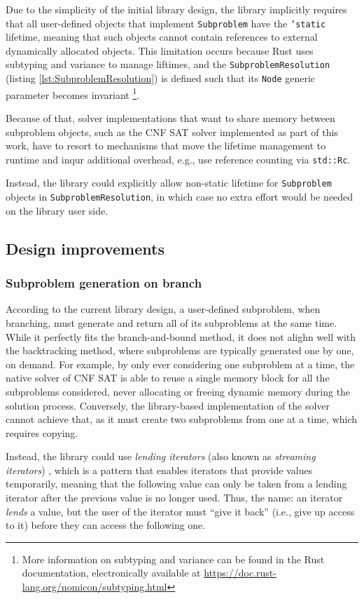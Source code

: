 Due to the simplicity of the initial library design, the library implicitly requires
that all user-defined objects that implement \texttt{Subproblem} have the \texttt{'static}
lifetime, meaning that such objects cannot contain references to external
dynamically allocated objects. This limitation occurs because Rust uses subtyping and
variance to manage liftimes, and the \texttt{SubproblemResolution}
(listing \ref{lst:SubproblemResolution}) is defined
such that its \texttt{Node} generic parameter becomes invariant
\footnote{More information on subtyping and variance can be found in the Rust documentation,
electronically available at \url{https://doc.rust-lang.org/nomicon/subtyping.html}}.

Because of that, solver implementations that want to share memory between subproblem objects,
such as the CNF SAT solver implemented as part of this work, have to resort to mechanisms
that move the lifetime management to runtime and inqur additional overhead, e.g.,
use reference counting via \texttt{std::Rc}.

Instead, the library could explicitly allow non-static lifetime for \texttt{Subproblem}
objects in \texttt{SubproblemResolution}, in which case no extra effort would be needed
on the library user side.

\subsection{Design improvements}

\subsubsection{Subproblem generation on branch}

According to the current library design, a user-defined subproblem, when branching,
must generate and return all of its subproblems at the same time. While it perfectly fits
the branch-and-bound method, it does not alighn well with the backtracking method, where
subproblems are typically generated one by one, on demand. For example, by only ever
considering one subproblem at a time, the native solver of CNF SAT is able to reuse
a single memory block for all the subproblems considered, never allocating or freeing
dynamic memory during the solution process. Conversely, the library-based implementation
of the solver cannot achieve that, as it must create two subproblems from one
at a time, which requires copying.

Instead, the library could use \emph{lending iterators}
(also known as \emph{streaming iterators}) \cite{LendingIterator},
which is a pattern that enables iterators that provide values temporarily,
meaning that the following value can only be taken from a lending iterator after the previous
value is no longer used. Thus, the name: an iterator \emph{lends} a value,
but the user of the iterator must ``give it back'' (i.e., give up access to it)
before they can access the following one.

